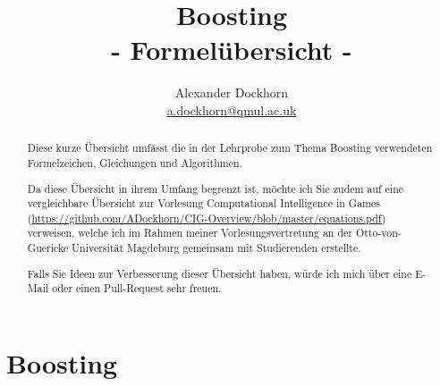 \documentclass[a4paper,12pt]{scrartcl}
\title{Boosting\\ - Formelübersicht -}
\author{Alexander Dockhorn\\
\href{mailto:a.dockhorn@qmul.ac.uk}{a.dockhorn@qmul.ac.uk}}
\begin{document}
\maketitle


\begin{abstract}

Diese kurze Übersicht umfässt die in der Lehrprobe zum Thema Boosting verwendeten Formelzeichen, Gleichungen und Algorithmen. 

Da diese Übersicht in ihrem Umfang begrenzt ist, möchte ich Sie zudem auf eine vergleichbare Übersicht zur Vorlesung Computational Intelligence in Games (\url{https://github.com/ADockhorn/CIG-Overview/blob/master/equations.pdf}) verweisen, welche ich im Rahmen meiner Vorlesungsvertretung an der Otto-von-Guericke Universität Magdeburg gemeinsam mit Studierenden erstellte.

Falls Sie Ideen zur Verbesserung dieser Übersicht haben, würde ich mich über eine E-Mail oder einen Pull-Request sehr freuen.



\end{abstract}


\listofequationfloat
\listofalgorithms

\newpage
\section{Boosting}
\end{document}
